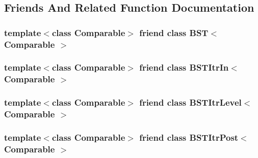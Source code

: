 \subsection{Friends And Related Function Documentation}
\hypertarget{class_binary_node_a28a1adb9906f3ff7e12c2cb6fa2bd54e}{
\subsubsection[{B\-S\-T$<$ Comparable $>$}]{\setlength{\rightskip}{0pt plus 5cm}template$<$class Comparable$>$ friend class {\bf B\-S\-T}$<$ Comparable $>$\hspace{0.3cm}{\ttfamily [friend]}}}\label{class_binary_node_a28a1adb9906f3ff7e12c2cb6fa2bd54e}
\hypertarget{class_binary_node_aab3993acac2ab24a0b59edb0c3acc775}{
\subsubsection[{B\-S\-T\-Itr\-In$<$ Comparable $>$}]{\setlength{\rightskip}{0pt plus 5cm}template$<$class Comparable$>$ friend class {\bf B\-S\-T\-Itr\-In}$<$ Comparable $>$\hspace{0.3cm}{\ttfamily [friend]}}}\label{class_binary_node_aab3993acac2ab24a0b59edb0c3acc775}
\hypertarget{class_binary_node_a26ff00bc0d87069aed877f10fd3c80a8}{
\subsubsection[{B\-S\-T\-Itr\-Level$<$ Comparable $>$}]{\setlength{\rightskip}{0pt plus 5cm}template$<$class Comparable$>$ friend class {\bf B\-S\-T\-Itr\-Level}$<$ Comparable $>$\hspace{0.3cm}{\ttfamily [friend]}}}\label{class_binary_node_a26ff00bc0d87069aed877f10fd3c80a8}
\hypertarget{class_binary_node_a5dc153694be266f6e772659486219da7}{
\subsubsection[{B\-S\-T\-Itr\-Post$<$ Comparable $>$}]{\setlength{\rightskip}{0pt plus 5cm}template$<$class Comparable$>$ friend class {\bf B\-S\-T\-Itr\-Post}$<$ Comparable $>$\hspace{0.3cm}{\ttfamily [friend]}}}\label{class_binary_node_a5dc153694be266f6e772659486219da7}
